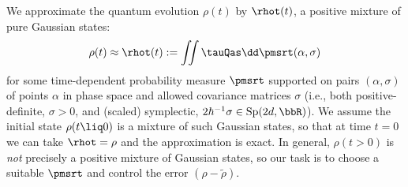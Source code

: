 \documentclass{article}
\numberwithin{equation}{section}
\begin{document}
We approximate the quantum evolution $\rho(t)$ by  $\rhot(t)$, a positive mixture of pure Gaussian states: 
\begin{equation} \label{eq:overview-mixture}
\rho(t) \approx \rhot(t) := 
\iint \tauQas \dd\pmsrt(\alpha,\sigma)
\end{equation}
for some time-dependent probability measure $\pmsrt$ 
supported on pairs $(\alpha,\sigma)$ of points $\alpha$ in phase space and allowed covariance matrices $\sigma$ (i.e., both positive-definite, $\sigma > 0$, and (scaled) symplectic, $2\hbar^{-1}\sigma \in \mathrm{Sp}(2d,\bbR)$).
We assume the initial state $\rho(t\liq0)$ is a mixture of such Gaussian states, so that at time $t=0$ we can take $\rhot=\rho$ and the approximation is exact. In general, $\rho(t>0)$ is \textit{not} precisely a positive mixture of Gaussian states, so our task is to choose a suitable $\pmsrt$ and control the error $(\rho-\tilde{\rho})$.
\end{document}
